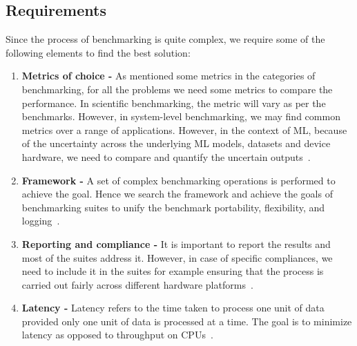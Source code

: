 \documentclass[a4paper,UKenglish,cleveref, autoref, thm-restate]{lipics-v2021}
\begin{document}
\subsection{Requirements}
\label{requirements}
Since the process of benchmarking is quite complex, we require some of the following elements to find the best solution:
\begin{enumerate}

\item \textbf{Metrics of choice -}
As mentioned some metrics in the categories of benchmarking, for all the problems we need some metrics to compare the performance.
In scientific benchmarking, the metric will vary as per the benchmarks. However, in system-level benchmarking, we may find common metrics over a range of applications. 
However, in the context of ML, because of the uncertainty across the underlying ML models, datasets and device hardware, we need to compare and quantify the uncertain outputs~\cite{sctmlb}.

\item \textbf{Framework -}
A set of complex benchmarking operations is performed to achieve the goal. Hence we search the framework and achieve the goals of benchmarking suites to unify the benchmark portability, flexibility, and logging~\cite{sctmlb}.

\item \textbf{Reporting and compliance -}
It is important to report the results and most of the suites address it. However, in case of specific compliances, we need to include it in the suites for example ensuring that the process is carried out fairly across different hardware platforms~\cite{sctmlb}.

\item \textbf{Latency -} 
Latency refers to the time taken to process one unit of data provided only one unit of data is processed at a time. The goal is to minimize latency as opposed to throughput on CPUs~\cite{sctmlb}.
\end{enumerate}
\end{document}
